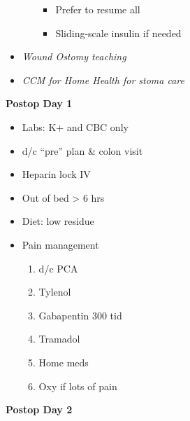 \documentclass[
]{book}
\providecommand{\tightlist}{%
  \setlength{\itemsep}{0pt}\setlength{\parskip}{0pt}}
\begin{document}
\begin{itemize}
\begin{itemize}
    \begin{itemize}
    \tightlist
    \item
      Prefer to resume all
    \item
      Sliding-scale insulin if needed
    \end{itemize}
  \end{itemize}
\item
  \emph{Wound Ostomy teaching}
\item
  \emph{CCM for Home Health for stoma care}
\end{itemize}

\textbf{Postop Day 1}

\begin{itemize}
\tightlist
\item
  Labs: K+ and CBC only
\item
  d/c ``pre'' plan \& colon visit
\item
  Heparin lock IV
\item
  Out of bed \textgreater{} 6 hrs
\item
  Diet: low residue
\item
  Pain management

  \begin{enumerate}
  \def\labelenumi{\arabic{enumi})}
  \tightlist
  \item
    d/c PCA
  \item
    Tylenol
  \item
    Gabapentin 300 tid
  \item
    Tramadol
  \item
    Home meds
  \item
    Oxy if lots of pain
  \end{enumerate}
\end{itemize}

\textbf{Postop Day 2}
\end{document}

